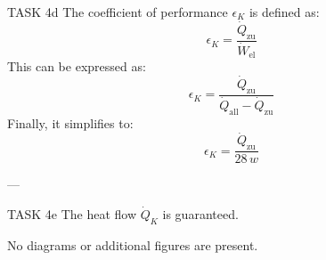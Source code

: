 TASK 4d  
The coefficient of performance \( \epsilon_K \) is defined as:  
\[
\epsilon_K = \frac{\dot{Q}_{\text{zu}}}{\dot{W}_{\text{el}}}
\]  
This can be expressed as:  
\[
\epsilon_K = \frac{\dot{Q}_{\text{zu}}}{\dot{Q}_{\text{all}} - \dot{Q}_{\text{zu}}}
\]  
Finally, it simplifies to:  
\[
\epsilon_K = \frac{\dot{Q}_{\text{zu}}}{28 \, w}
\]  

---

TASK 4e  
The heat flow \( \dot{Q}_K \) is guaranteed.  

No diagrams or additional figures are present.